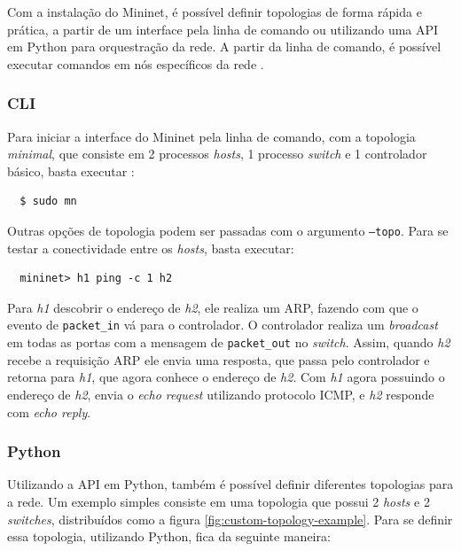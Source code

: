 \documentclass[
    12pt,
    openright, 
    oneside,
    a4paper,
    french,
    english,
    brazil
    ]{facom-ufu-abntex2}
\theoremstyle{definition}
\begin{document}
Com a instalação do Mininet, é possível definir topologias de forma rápida e prática, a partir
de um interface pela linha de comando ou utilizando uma API em Python para orquestração da rede.
A partir da linha de comando, é possível executar comandos em nós específicos da rede 
\cite{mininetDocs}. 

\subsubsection{CLI}
Para iniciar a interface do Mininet pela linha de comando, com a topologia
\emph{minimal}, que consiste em 2 processos \emph{hosts}, 1 processo \emph{switch} e 1 controlador
básico, basta executar \cite{mininetOrg}:

\begin{verbatim}
  $ sudo mn
\end{verbatim}

Outras opções de topologia podem ser passadas com o argumento \texttt{--topo}. Para se testar a
conectividade entre os \emph{hosts}, basta executar:

\begin{verbatim}
  mininet> h1 ping -c 1 h2
\end{verbatim}

Para \emph{h1} descobrir o endereço de \emph{h2}, ele realiza um ARP, fazendo com que o evento de 
\texttt{packet\_in} vá para o controlador. O controlador realiza um \emph{broadcast} em todas as portas
com a mensagem de \texttt{packet\_out} no \emph{switch}. Assim, quando \emph{h2} recebe a requisição ARP ele
envia uma resposta, que passa pelo controlador e retorna para \emph{h1}, que agora conhece o endereço
de \emph{h2}. Com \emph{h1} agora possuindo o endereço de \emph{h2}, envia o \emph{echo request} utilizando
protocolo ICMP, e \emph{h2} responde com \emph{echo reply}.

\subsubsection{Python}
Utilizando a API em Python, também é possível definir diferentes topologias para a rede. Um
exemplo simples consiste em uma topologia que possui 2 \emph{hosts} e 2 \emph{switches}, distribuídos como
a figura \ref{fig:custom-topology-example}. Para se definir essa topologia, utilizando
Python, fica da seguinte maneira:


\end{document}
